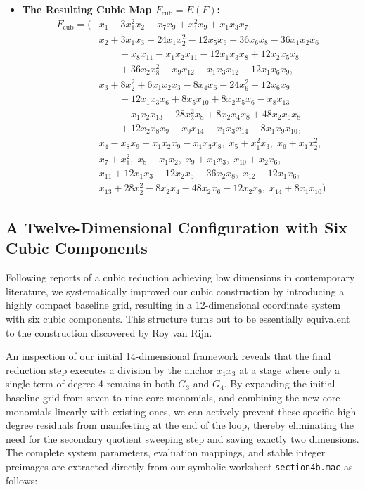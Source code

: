 \documentclass[11pt,a4paper]{article}
\begin{document}
\begin{itemize}
    \item \textbf{The Resulting Cubic Map $F_{\text{cub}} = E(F)$:}
    \begin{align*}
    F_{\text{cub}} = \big( & x_1 - 3x_1^2x_2 + x_7x_9 + x_1^2x_9 + x_1x_3x_7, \\
    & x_2 + 3x_1x_3 + 24x_1x_2^2 - 12x_5x_6 - 36x_6x_8 - 36x_1x_2x_6 \\
    & \qquad - x_8x_{11} - x_1x_2x_{11} - 12x_1x_3x_8 + 12x_2x_5x_8 \\
    & \qquad + 36x_2x_8^2 - x_9x_{12} - x_1x_3x_{12} + 12x_1x_6x_9, \\
    & x_3 + 8x_2^2 + 6x_1x_2x_3 - 8x_4x_6 - 24x_6^2 - 12x_6x_9 \\
    & \qquad - 12x_1x_3x_6 + 8x_5x_{10} + 8 x_2 x_5 x_6 - x_8x_{13} \\
    & \qquad - x_1x_2x_{13} - 28x_2^2x_8 + 8x_2x_4x_8 + 48x_2x_6x_8 \\
    & \qquad + 12x_2x_8x_9 - x_9x_{14} - x_1x_3x_{14} - 8x_1x_9x_{10}, \\
    & x_4 - x_8x_9 - x_1x_2x_9 - x_1x_3x_8, \; x_5 + x_1^2x_3, \; x_6 + x_1x_2^2, \\
    & x_7 + x_1^2, \; x_8 + x_1x_2, \; x_9 + x_1x_3, \; x_{10} + x_2x_6, \\
    & x_{11} + 12x_1x_3 - 12x_2x_5 - 36x_2x_8, \; x_{12} - 12x_1x_6, \\
    & x_{13} + 28x_2^2 - 8x_2x_4 - 48x_2x_6 - 12x_2x_9, \; x_{14} + 8x_1x_{10} \big)
    \end{align*}
\end{itemize}

\subsection{A Twelve-Dimensional Configuration with Six Cubic Components}
\label{subsec:cubic_12d_six}

Following reports of a cubic reduction achieving low dimensions in contemporary literature, we systematically improved our cubic construction by introducing a highly compact baseline grid, resulting in a 12-dimensional coordinate system with six cubic components. This structure turns out to be essentially equivalent to the construction discovered by Roy van Rijn.

An inspection of our initial 14-dimensional framework reveals that the final reduction step executes a division by the anchor $x_1 x_3$ at a stage where only a single term of degree 4 remains in both $G_3$ and $G_4$. By expanding the initial baseline grid from seven to nine core monomials, and combining the new core monomials linearly with existing ones, we can actively prevent these specific high-degree residuals from manifesting at the end of the loop, thereby eliminating the need for the secondary quotient sweeping step and saving exactly two dimensions. The complete system parameters, evaluation mappings, and stable integer preimages are extracted directly from our symbolic worksheet \texttt{section4b.mac} as follows:
\end{document}
